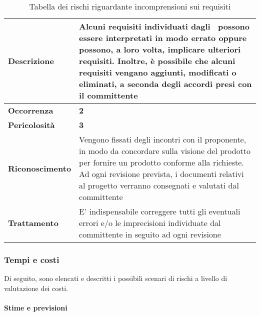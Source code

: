 \begin{table}[H]
	\begin{center}
		\begin{tabular}{|>{\centering\arraybackslash} m{3cm}  ||>{\centering\arraybackslash} m{10cm}|}
			\hline
			\textbf{Descrizione}	& Alcuni requisiti individuati dagli \textit{\Anas}\ possono essere interpretati in modo errato oppure possono, a loro volta, implicare ulteriori requisiti. Inoltre, è possibile che alcuni requisiti vengano aggiunti, modificati o eliminati, a seconda degli accordi presi con il committente\\
			\hline
			\textbf{Occorrenza}	&	\textbf{2}	\\
			\hline
			\textbf{Pericolosità}	&	\textbf{3}	\\
			\hline
			\textbf{Riconoscimento}	&	Vengono fissati degli incontri con il proponente, in modo da concordare sulla visione del prodotto per fornire un prodotto conforme alla richieste. Ad ogni revisione prevista, i documenti relativi al progetto verranno consegnati e valutati dal committente	\\
			\hline
			\textbf{Trattamento}	&	E' indispensabile correggere tutti gli eventuali errori e/o le imprecisioni individuate dal committente in seguito ad ogni revisione	\\
			\hline
		\end{tabular}
		\caption{Tabella dei rischi riguardante incomprensioni sui requisiti}
	\end{center}
\end{table}

\subsubsection{Tempi e costi}

Di seguito, sono elencati e descritti i possibili scenari di rischi a livello di valutazione dei costi.

\paragraph{Stime e previsioni}

